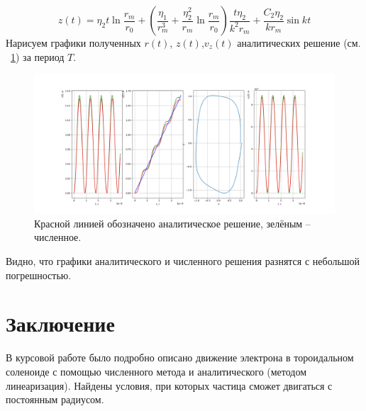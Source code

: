 \begin{equation}
    z(t) = \eta_2 t \ln{\frac{r_m}{r_0}} + \left( \frac{\eta_1}{r_m^3} + \frac{\eta_2^2}{r_m} \ln{\frac{r_m}{r_0}} \right) \frac{t \eta_2}{k^2 r_m} + \frac{C_2 \eta_2}{k r_m} \sin{kt}    
\end{equation}
Нарисуем графики полученных $r(t)$, $z(t)$,$v_z(t)$ аналитических решение (см. ~\ref{fig:4}) за период $T$.
\begin{figure}[h]
    \centering
    \includegraphics[width=1\linewidth]{../prog/Figure_3.png}\caption{Красной линией обозначено аналитическое решение, зелёным -- численное. }\label{fig:4}
\end{figure}
\par
Видно, что графики аналитического и численного решения разнятся с небольшой погрешностью.
% 
\newpage
\section{Заключение}
В курсовой работе было подробно описано движение электрона в тороидальном соленоиде с помощью численного метода и аналитического (методом линеаризация). Найдены условия, при которых частица сможет двигаться с постоянным радиусом. 